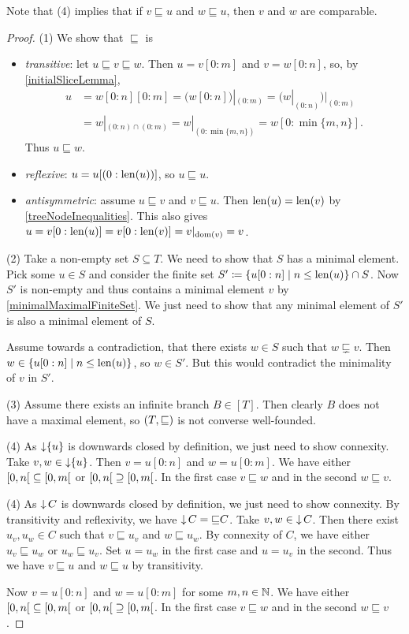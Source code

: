 Note that (4) implies that if $v\sqsubseteq u$ and $w\sqsubseteq u$, then $v$ and $w$ are comparable.
\begin{proof}
(1) We show that $\sqsubseteq$ is
\begin{itemize}
\item \emph{transitive}: let $u \sqsubseteq v \sqsubseteq w$. Then $u = v[0:m]$ and $v = w[0:n]$, so, by \ref{initialSliceLemma},
\begin{align*}
u &= w[0:n][0:m] = \big(w[0:n]\big)|_{(0:m)} = \big(w|_{(0:n)}\big)|_{(0:m)} \\
&= w|_{(0:n)\cap(0:m)} = w|_{(0:\min\{m,n\})} = w[0:\min\{m,n\}].
\end{align*}
Thus $u \sqsubseteq w$.
\item \emph{reflexive}: $u = u[(0:\operatorname{len}(u))]$, so $u \sqsubseteq u$.
\item \emph{antisymmetric}: assume $u\sqsubseteq v$ and $v\sqsubseteq u$. Then $\operatorname{len}(u) = \operatorname{len}(v)$ by \ref{treeNodeInequalities}. This also gives $u = v[0: \operatorname{len}(u)] = v[0:\operatorname{len}(v)] = v|_{\operatorname{dom}(v)} = v$.
\end{itemize}

(2) Take a non-empty set $S\subseteq T$. We need to show that $S$ has a minimal element. Pick some $u\in S$ and consider the finite set $S' \defeq \setbuilder{u[0:n]}{n\leq \len(u)} \cap S$. Now $S'$ is non-empty and thus contains a minimal element $v$ by \ref{minimalMaximalFiniteSet}. We just need to show that any minimal element of $S'$ is also a minimal element of $S$. 

Assume towards a contradiction, that there exists $w\in S$ such that $w\sqsubsetneq v$. Then $w\in \setbuilder{u[0:n]}{n\leq \len(u)}$, so $w\in S'$. But this would contradict the minimality of $v$ in $S'$.

(3) Assume there exists an infinite branch $B\in [T]$. Then clearly $B$ does not have a maximal element, so $\sSet{T,\sqsubseteq}$ is not converse well-founded.

(4) As $\operatorname{\downarrow}\{u\}$ is downwards closed by definition, we just need to show connexity. Take $v,w\in \operatorname{\downarrow}\{u\}$. Then $v = u[0:n]$ and $w = u[0:m]$. We have either $\interval[co]{0,n} \subseteq \interval[co]{0,m}$ or $\interval[co]{0,n} \supseteq \interval[co]{0,m}$. In the first case $v \sqsubseteq w$ and in the second $w\sqsubseteq v$.

(4) As $\operatorname{\downarrow} C$ is downwards closed by definition, we just need to show connexity. By transitivity and reflexivity, we have $\operatorname{\downarrow} C = {\sqsubseteq}C$. Take $v,w\in \operatorname{\downarrow} C$. Then there exist $u_v, u_w\in C$ such that $v \sqsubseteq u_v$ and $w \sqsubseteq u_w$. By connexity of $C$, we have either $u_v \sqsubseteq u_w$ or $u_w\sqsubseteq u_v$. Set $u = u_w$ in the first case and $u=u_v$ in the second. Thus we have $v\sqsubseteq u$ and $w\sqsubseteq u$ by transitivity.

Now $v = u[0:n]$ and $w = u[0:m]$ for some $m,n\in\mathbb{N}$. We have either $\interval[co]{0,n} \subseteq \interval[co]{0,m}$ or $\interval[co]{0,n} \supseteq \interval[co]{0,m}$. In the first case $v \sqsubseteq w$ and in the second $w\sqsubseteq v$.
\end{proof}

